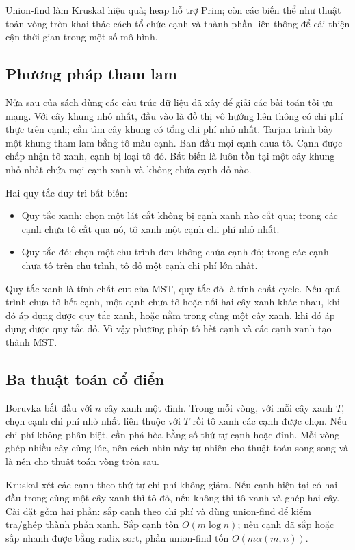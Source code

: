 \documentclass[11pt]{article}
\begin{document}
Union-find làm Kruskal hiệu quả; heap hỗ trợ Prim; còn các biến thể như thuật
toán vòng tròn khai thác cách tổ chức cạnh và thành phần liên thông để cải
thiện cận thời gian trong một số mô hình.

\subsection*{Phương pháp tham lam}

Nửa sau của sách dùng các cấu trúc dữ liệu đã xây để giải các bài toán tối ưu
mạng. Với cây khung nhỏ nhất, đầu vào là đồ thị vô hướng liên thông có chi phí
thực trên cạnh; cần tìm cây khung có tổng chi phí nhỏ nhất. Tarjan trình bày một
khung tham lam bằng tô màu cạnh. Ban đầu mọi cạnh chưa tô. Cạnh được chấp nhận
tô xanh, cạnh bị loại tô đỏ. Bất biến là luôn tồn tại một cây khung nhỏ nhất
chứa mọi cạnh xanh và không chứa cạnh đỏ nào.

Hai quy tắc duy trì bất biến:
\begin{itemize}
  \item Quy tắc xanh: chọn một lát cắt không bị cạnh xanh nào cắt qua; trong các
        cạnh chưa tô cắt qua nó, tô xanh một cạnh chi phí nhỏ nhất.
  \item Quy tắc đỏ: chọn một chu trình đơn không chứa cạnh đỏ; trong các cạnh
        chưa tô trên chu trình, tô đỏ một cạnh chi phí lớn nhất.
\end{itemize}
Quy tắc xanh là tính chất cut của MST, quy tắc đỏ là tính chất cycle. Nếu quá
trình chưa tô hết cạnh, một cạnh chưa tô hoặc nối hai cây xanh khác nhau, khi đó
áp dụng được quy tắc xanh, hoặc nằm trong cùng một cây xanh, khi đó áp dụng
được quy tắc đỏ. Vì vậy phương pháp tô hết cạnh và các cạnh xanh tạo thành MST.

\subsection*{Ba thuật toán cổ điển}

Boruvka bắt đầu với \(n\) cây xanh một đỉnh. Trong mỗi vòng, với mỗi cây xanh
\(T\), chọn cạnh chi phí nhỏ nhất liên thuộc với \(T\) rồi tô xanh các cạnh được
chọn. Nếu chi phí không phân biệt, cần phá hòa bằng số thứ tự cạnh hoặc đỉnh.
Mỗi vòng ghép nhiều cây cùng lúc, nên cách nhìn này tự nhiên cho thuật toán song
song và là nền cho thuật toán vòng tròn sau.

Kruskal xét các cạnh theo thứ tự chi phí không giảm. Nếu cạnh hiện tại có hai
đầu trong cùng một cây xanh thì tô đỏ, nếu không thì tô xanh và ghép hai cây.
Cài đặt gồm hai phần: sắp cạnh theo chi phí và dùng union-find để kiểm tra/ghép
thành phần xanh. Sắp cạnh tốn \(O(m\log n)\); nếu cạnh đã sắp hoặc sắp nhanh
được bằng radix sort, phần union-find tốn \(O(m\alpha(m,n))\).
\end{document}
